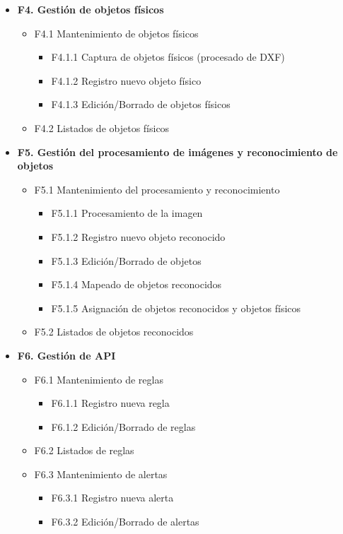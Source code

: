 \documentclass[12pt,a4paper]{article}
\begin{document}
\begin{itemize}
		\item \textbf{F4. Gestión de objetos físicos}
		\begin{itemize}
			\item F4.1 Mantenimiento de objetos físicos
			\begin{itemize}
				\item F4.1.1 Captura de objetos físicos (procesado de DXF)
				\item F4.1.2 Registro nuevo objeto físico
				\item F4.1.3 Edición/Borrado de objetos físicos
			\end{itemize}
			\item F4.2 Listados de objetos físicos
		\end{itemize}
		\item \textbf{F5. Gestión del procesamiento de imágenes y reconocimiento de objetos}
		\begin{itemize}
			\item F5.1 Mantenimiento del procesamiento y reconocimiento
			\begin{itemize}
				\item F5.1.1 Procesamiento de la imagen
				\item F5.1.2 Registro nuevo objeto reconocido
				\item F5.1.3 Edición/Borrado de objetos
				\item F5.1.4 Mapeado de objetos reconocidos
				\item F5.1.5 Asignación de objetos reconocidos y objetos físicos
			\end{itemize}
			\item F5.2 Listados de objetos reconocidos
		\end{itemize}
		\item \textbf{F6. Gestión de API}
		\begin{itemize}
			\item F6.1 Mantenimiento de reglas
			\begin{itemize}
				\item F6.1.1 Registro nueva regla
				\item F6.1.2 Edición/Borrado de reglas
			\end{itemize}
			\item F6.2 Listados de reglas
			\item F6.3 Mantenimiento de alertas
			\begin{itemize}
				\item F6.3.1 Registro nueva alerta
				\item F6.3.2 Edición/Borrado de alertas

\end{itemize}
\end{itemize}
\end{itemize}
\end{document}
